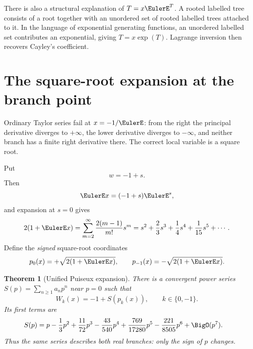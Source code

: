 \documentclass[11pt]{article}
\newtheorem{theorem}{Theorem}[section]
\theoremstyle{remark}
\begin{document}
There is also a structural explanation of \(T=x\EulerE^T\).  A rooted labelled
tree consists of a root together with an unordered set of rooted labelled
trees attached to it.  In the language of exponential generating functions,
an unordered labelled set contributes an exponential, giving
\(T=x\exp(T)\).  Lagrange inversion then recovers Cayley's coefficient.


\section{The square-root expansion at the branch point}\label{sec:branchpoint}

Ordinary Taylor series fail at \(x=-1/\EulerE\): from the right the principal
derivative diverges to \(+\infty\), the lower derivative diverges to
\(-\infty\), and neither branch has a finite right derivative there.  The
correct local variable is a square root.

Put
\[
       w=-1+s.
\]
Then
\[
 \EulerE x=(-1+s)\EulerE^s,
\]
and expansion at \(s=0\) gives
\begin{equation}\label{eq:p-s-relation}
 2(1+\EulerE x)
 =\sum_{m=2}^{\infty}\frac{2(m-1)}{m!}s^m
 =s^2+\frac23s^3+\frac14s^4+\frac1{15}s^5+\cdots.
\end{equation}
Define the \emph{signed} square-root coordinates
\begin{equation}\label{eq:signedp}
 p_0(x)=+\sqrt{2(1+\EulerE x)},\qquad
 p_{-1}(x)=-\sqrt{2(1+\EulerE x)}.
\end{equation}

\begin{theorem}[Unified Puiseux expansion]\label{thm:puiseux}
There is a convergent power series \(S(p)=\sum_{n\geq1}a_np^n\) near
\(p=0\) such that
\begin{equation}\label{eq:unified-puiseux}
       W_k(x)=-1+S(p_k(x)),\qquad k\in\{0,-1\}.
\end{equation}
Its first terms are
\begin{align}
 S(p)={}&p-\frac13p^2+\frac{11}{72}p^3-\frac{43}{540}p^4
       +\frac{769}{17280}p^5-\frac{221}{8505}p^6
       +\BigO(p^7).\label{eq:puiseux-series}
\end{align}
Thus the same series describes both real branches: only the sign of \(p\)
changes.
\end{theorem}
\end{document}
